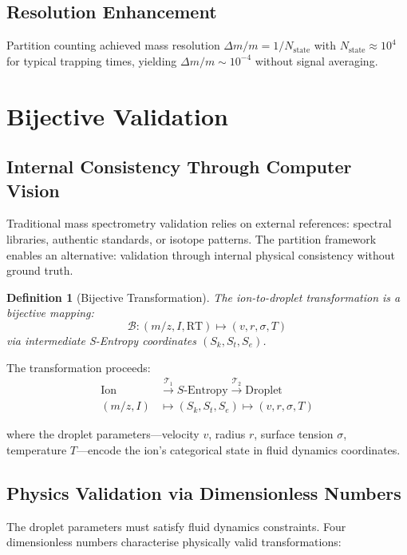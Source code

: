 \documentclass[twocolumn,10pt]{article}
\newtheorem{definition}[theorem]{Definition}
\newcommand{\Nstate}{N_{\mathrm{state}}}
\begin{document}
\subsection{Resolution Enhancement}

Partition counting achieved mass resolution $\Delta m/m = 1/\Nstate$ with $\Nstate \approx 10^4$ for typical trapping times, yielding $\Delta m/m \sim 10^{-4}$ without signal averaging.

\section{Bijective Validation}
\label{sec:bijective}

\subsection{Internal Consistency Through Computer Vision}

Traditional mass spectrometry validation relies on external references: spectral libraries, authentic standards, or isotope patterns. The partition framework enables an alternative: validation through internal physical consistency without ground truth.

\begin{definition}[Bijective Transformation]
The ion-to-droplet transformation is a bijective mapping:
\begin{equation}
    \mathcal{B}: (m/z, I, \text{RT}) \mapsto (v, r, \sigma, T)
\end{equation}
via intermediate S-Entropy coordinates $(S_k, S_t, S_e)$.
\end{definition}

The transformation proceeds:
\begin{align}
    \text{Ion} &\xrightarrow{\mathcal{T}_1} S\text{-Entropy} \xrightarrow{\mathcal{T}_2} \text{Droplet} \\
    (m/z, I) &\mapsto (S_k, S_t, S_e) \mapsto (v, r, \sigma, T)
\end{align}

where the droplet parameters---velocity $v$, radius $r$, surface tension $\sigma$, temperature $T$---encode the ion's categorical state in fluid dynamics coordinates.

\subsection{Physics Validation via Dimensionless Numbers}

The droplet parameters must satisfy fluid dynamics constraints. Four dimensionless numbers characterise physically valid transformations:
\end{document}

